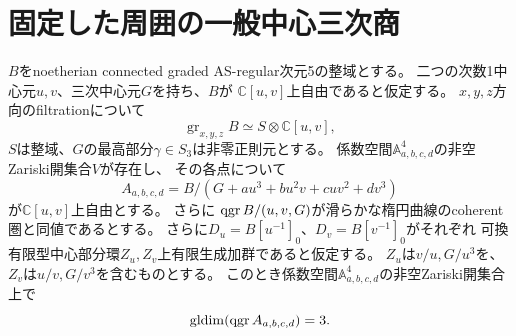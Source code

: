 \section{固定した周囲の一般中心三次商}
\begin{theorem}[有限中心チャートの一般二元三次係数]\label{thm:generic}
$B$をnoetherian connected graded AS-regular次元5の整域とする。
二つの次数1中心元$u,v$、三次中心元$G$を持ち、$B$が
$\mathbb C[u,v]$上自由であると仮定する。
$x,y,z$方向のfiltrationについて
\[
\operatorname{gr}_{x,y,z}B
\simeq S\otimes\mathbb C[u,v],
\]
$S$は整域、$G$の最高部分$\gamma\in S_3$は非零正則元とする。
係数空間$\mathbb A^4_{a,b,c,d}$の非空Zariski開集合$V$が存在し、
その各点について
\[
A_{a,b,c,d}
=B/(G+au^3+bu^2v+cuv^2+dv^3)
\]
が$\mathbb C[u,v]$上自由とする。
さらに
$\operatorname{qgr} B/(u,v,G)$が滑らかな楕円曲線のcoherent圏と同値であるとする。
さらに$D_u=B[u^{-1}]_0$、$D_v=B[v^{-1}]_0$がそれぞれ
可換有限型中心部分環$Z_u,Z_v$上有限生成加群であると仮定する。
$Z_u$は$v/u,G/u^3$を、$Z_v$は$u/v,G/v^3$を含むものとする。
このとき係数空間$\mathbb A^4_{a,b,c,d}$の非空Zariski開集合上で
\[
\operatorname{gldim}(\operatorname{qgr} A_{a,b,c,d})=3.
\]
\end{theorem}
